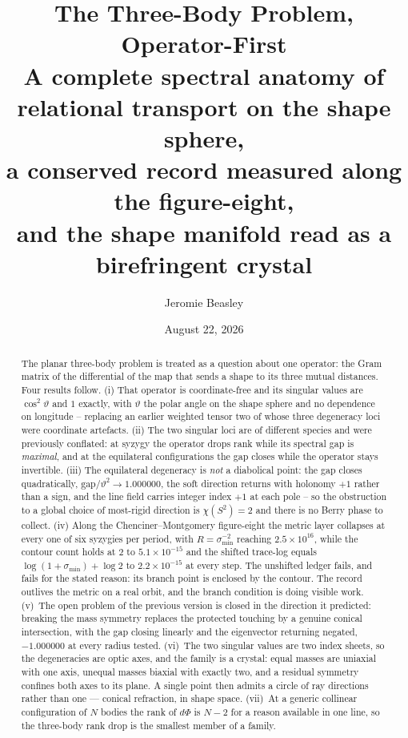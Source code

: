 \documentclass[11pt]{article}
\title{The Three-Body Problem, Operator-First\\
\large A complete spectral anatomy of relational transport on the shape sphere,\\
a conserved record measured along the figure-eight,\\
and the shape manifold read as a birefringent crystal}
\author{Jeromie Beasley}
\date{August 22, 2026}
\theoremstyle{remark}
\begin{document}
\maketitle

\begin{abstract}
The planar three-body problem is treated as a question about one operator: the Gram matrix
of the differential of the map that sends a shape to its three mutual distances. Four
results follow. (i) That operator is coordinate-free and its singular values are
$\cos^2\vartheta$ and $1$ exactly, with $\vartheta$ the polar angle on the shape sphere and
no dependence on longitude -- replacing an earlier weighted tensor two of whose three
degeneracy loci were coordinate artefacts. (ii) The two singular loci are of different
species and were previously conflated: at syzygy the operator drops rank while its spectral
gap is \emph{maximal}, and at the equilateral configurations the gap closes while the
operator stays invertible. (iii) The equilateral degeneracy is \emph{not} a diabolical
point: the gap closes quadratically, $\mathrm{gap}/\vartheta^{2}\to1.000000$, the soft
direction returns with holonomy $+1$ rather than a sign, and the line field carries integer
index $+1$ at each pole -- so the obstruction to a global choice of most-rigid direction is
$\chi(S^{2})=2$ and there is no Berry phase to collect. (iv) Along the
Chenciner--Montgomery figure-eight the metric layer collapses at every one of six syzygies
per period, with $R=\sigma_{\min}^{-2}$ reaching $2.5\times10^{16}$, while the contour count
holds at $2$ to $5.1\times10^{-15}$ and the shifted trace-log equals
$\log(1+\sigma_{\min})+\log2$ to $2.2\times10^{-15}$ at every step. The unshifted ledger
fails, and fails for the stated reason: its branch point is enclosed by the contour. The
record outlives the metric on a real orbit, and the branch condition is doing visible work.
(v)~The open problem of the previous version is closed in the direction it predicted:
breaking the mass symmetry replaces the protected touching by a genuine conical
intersection, with the gap closing linearly and the eigenvector returning negated,
$-1.000000$ at every radius tested. (vi)~The two singular values are two index sheets, so
the degeneracies are optic axes, and the family is a crystal: equal masses are uniaxial
with one axis, unequal masses biaxial with exactly two, and a residual symmetry confines
both axes to its plane. A single point then admits a circle of ray directions rather than
one --- conical refraction, in shape space. (vii)~At a generic collinear configuration of
$N$ bodies the rank of $d\Phi$ is $N-2$ for a reason available in one line, so the
three-body rank drop is the smallest member of a family.
\end{abstract}
\end{document}
